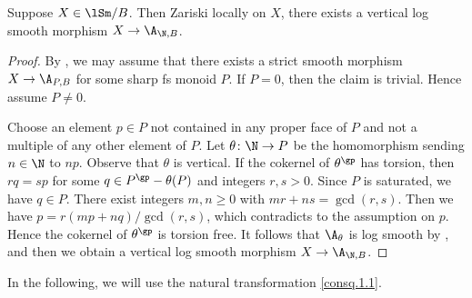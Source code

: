 \documentclass[10pt]{amsart}
\begin{document}
\begin{lem}
\label{local.13}
Suppose $X\in \lSm/B$.
Then Zariski locally on $X$, there exists a vertical log smooth morphism $X\to \A_{\N,B}$.
\end{lem}
\begin{proof}
By \cite[Lemma A.5.9]{logDM}, we may assume that there exists a strict smooth morphism $X\to \A_{P,B}$ for some sharp fs monoid $P$.
If $P=0$, then the claim is trivial.
Hence assume $P\neq 0$.

Choose an element $p\in P$ not contained in any proper face of $P$ and not a multiple of any other element of $P$.
Let $\theta\colon \N\to P$ be the homomorphism sending $n\in \N$ to $np$.
Observe that $\theta$ is vertical.
If the cokernel of $\theta^\gp$ has torsion, then $rq=sp$ for some $q\in P^\gp-\theta(P)$ and integers $r,s>0$.
Since $P$ is saturated, we have $q\in P$.
There exist integers $m,n\geq 0$ with $mr+ns=\gcd(r,s)$.
Then we have $p=r(mp+nq)/\gcd(r,s)$, which contradicts to the assumption on $p$.
Hence the cokernel of $\theta^\gp$ is torsion free.
It follows that $\A_\theta$ is log smooth by \cite[Theorem IV.3.1.8]{Ogu}, and 
then we obtain a vertical log smooth morphism $X\to \A_{\N,B}$.
\end{proof}

In the following, we will use the natural transformation \eqref{consq.1.1}.
\end{document}
